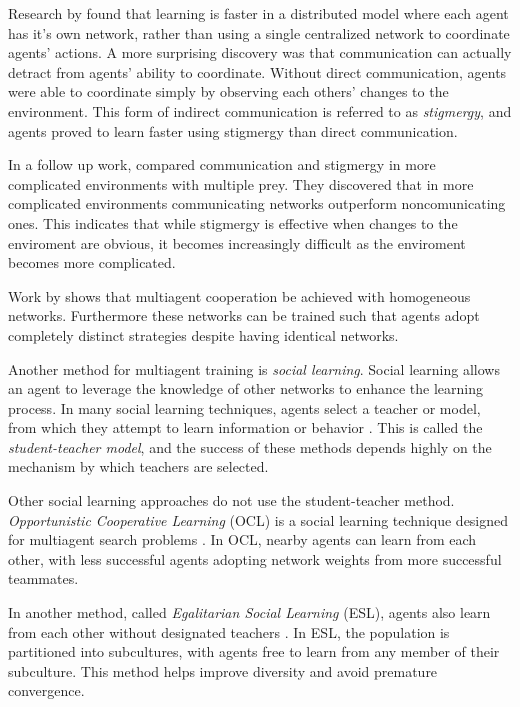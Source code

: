 \documentclass[conference]{IEEEtran}
\begin{document}
Research by \cite{yong2001cooperative} found that learning is faster in a distributed model where each agent has it's own network, rather than using a single centralized network to coordinate agents' actions.
A more surprising discovery was that communication can actually detract from agents' ability to coordinate. 
Without direct communication, agents were able to coordinate simply by observing each others' changes to the environment. This form of indirect communication is referred to as \textit{stigmergy}, and agents proved to learn faster using stigmergy than direct communication. 

In a follow up work, \cite{rajagopalan2011role} compared communication and stigmergy in more complicated environments with multiple prey. They discovered that in more complicated environments communicating networks outperform noncomunicating ones. This indicates that while stigmergy is effective when changes to the enviroment are obvious, it becomes increasingly difficult as the enviroment becomes more complicated.

Work by \cite{bryant2003neuroevolution} shows that multiagent cooperation be achieved with homogeneous networks. Furthermore these networks can be trained such that agents adopt completely distinct strategies despite having identical networks.

Another method for multiagent training is \textit{social learning}. Social learning allows an agent to leverage the knowledge of other networks to enhance the learning process.
In many social learning techniques, agents select a teacher or model, from which they attempt to learn information or behavior \cite{acerbi2006cultural}. This is called the \textit{student-teacher model}, and the success of these methods depends highly on the mechanism by which teachers are selected.

Other social learning approaches do not use the student-teacher method. \textit{Opportunistic Cooperative Learning} (OCL) is a social learning technique designed for multiagent search problems \cite{yang2002ocl}. In OCL, nearby agents can learn from each other, with less successful agents adopting network weights from more successful teammates. 

In another method, called \textit{Egalitarian Social Learning} (ESL), agents also learn from each other without designated teachers \cite{miikkulainen2012multiagent}. In ESL, the population is partitioned into subcultures, with agents free to learn from any member of their subculture. This method helps improve diversity and avoid premature convergence.
\end{document}
